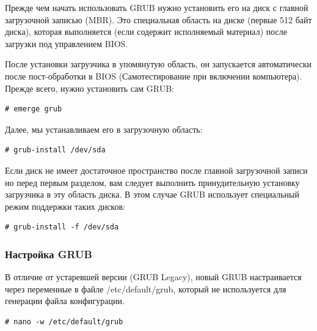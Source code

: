 \documentclass[10pt]{book}
\begin{document}
Прежде чем начать использовать GRUB нужно установить его на диск с главной загрузочной записью (MBR). Это специальная область на диске (первые 512 байт диска), которая выполняется (если содержит исполняемый материал) после загрузки под управлением BIOS.

После установки загрузчика в упомянутую область, он запускается автоматически после пост-обработки в BIOS (Самотестирование при включении компьютера).
Прежде всего, нужно установить сам GRUB:

\vspace{3mm}
\begin{tcolorbox}
\begin{lstlisting}
# emerge grub
\end{lstlisting}
\end{tcolorbox}

Далее, мы устанавливаем его в загрузочную область:

\vspace{3mm}
\begin{tcolorbox}
\begin{lstlisting}
# grub-install /dev/sda
\end{lstlisting}
\end{tcolorbox}

Если диск не имеет достаточное пространство после главной загрузочной записи но перед первым разделом, вам следует выполнить принудительную установку загрузчика в эту область диска.
В этом случае GRUB использует специальный режим поддержки таких дисков:

\vspace{3mm}
\begin{tcolorbox}
\begin{lstlisting}
# grub-install -f /dev/sda
\end{lstlisting}
\end{tcolorbox}

\subsubsection{Настройка GRUB}

В отличие от устаревшей версии (GRUB Legacy), новый GRUB настраивается через переменные в файле /etc/default/grub, который не используется для генерации файла конфигурации.

\vspace{3mm}
\begin{tcolorbox}
\begin{lstlisting}
# nano -w /etc/default/grub
\end{lstlisting}
\end{tcolorbox}
\end{document}
